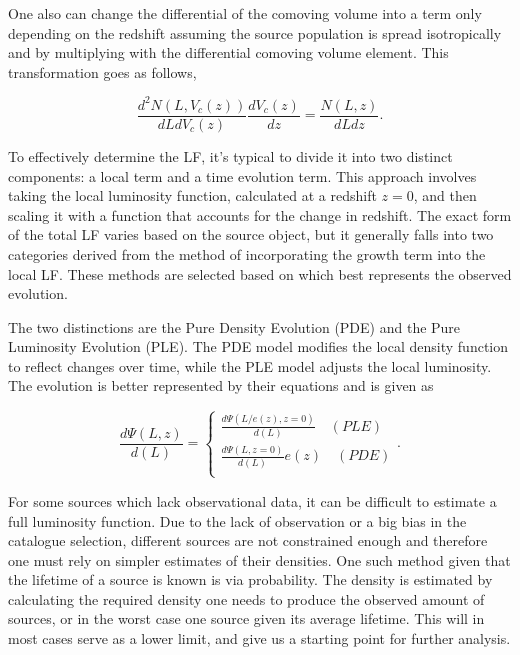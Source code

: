 One also can change the differential of the comoving volume into a term only depending on the redshift assuming the source population is spread isotropically and by multiplying with the differential comoving volume element. This 
transformation goes as follows, 

\begin{equation}
    \frac{d^2N(L,V_c(z))}{dLdV_c(z)}\frac{dV_c(z)}{dz} = \frac{N(L,z)}{dLdz}.
\end{equation}

To effectively determine the LF, it's typical to divide it into two distinct components: a local term and a time evolution term.
This approach involves taking the local luminosity function, calculated at a redshift 
$z=0$, and then scaling it with a function that accounts for the change in redshift. 
The exact form of the total LF varies based on the source object, but it generally falls into two categories derived from the method of incorporating the growth term into the local LF.
These methods are selected based on which best represents the observed evolution.

The two distinctions are the Pure Density Evolution (PDE) and the Pure Luminosity Evolution (PLE). 
The PDE model modifies the local density function to reflect changes over time, 
while the PLE model adjusts the local luminosity. The evolution is better represented by their equations and is given as 

\begin{equation}
\frac{d\Psi(L,z)}{d(L)} = 
    \begin{cases}
        \frac{d\Psi(L/e(z),z=0)}{d(L)} \quad (PLE)\\
        \frac{d\Psi(L,z=0)}{d(L)}e(z) \quad (PDE)\\
    \end{cases} .
\end{equation}

For some sources which lack observational data, it can be difficult to estimate a full luminosity function. Due to the lack of observation or a big bias in the catalogue selection, different sources are not constrained enough and therefore one must rely on simpler estimates of their densities. One such method given that the lifetime of a source is known is via probability. The density is estimated by calculating the required density one needs to produce the observed amount of sources, or in the worst case one source given its average lifetime. This will in most cases serve as a lower limit, and give us a starting point for further analysis.  

